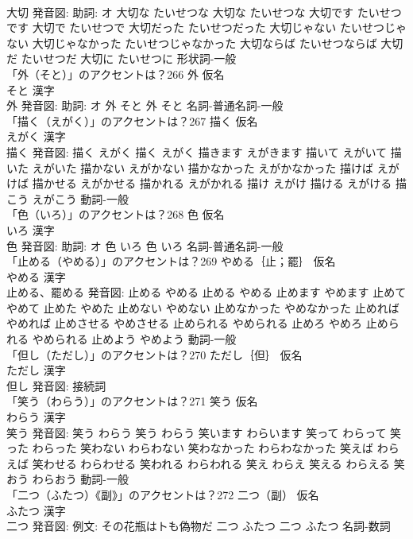 \documentclass[8pt]{extreport}
\begin{document}
\begin{CJK}{UTF8}{min}
\\	大切 発音図: 助詞: オ	大切な たいせつな		大切な たいせつな 大切です たいせつです 大切で たいせつで 大切だった たいせつだった 大切じゃない たいせつじゃない 大切じゃなかった たいせつじゃなかった 大切ならば たいせつならば 大切だ たいせつだ 大切に たいせつに				形状詞-一般 
\\	「外（そと）」のアクセントは？266	外 仮名　
\\	そと 漢字　
\\	外 発音図: 助詞: オ	外 そと		外 そと				名詞-普通名詞-一般 
\\	「描く（えがく）」のアクセントは？267	描く 仮名　
\\	えがく 漢字　
\\	描く 発音図:	描く えがく		描く えがく 描きます えがきます 描いて えがいて 描いた えがいた 描かない えがかない 描かなかった えがかなかった 描けば えがけば 描かせる えがかせる 描かれる えがかれる 描け えがけ 描ける えがける 描こう えがこう				動詞-一般 
\\	「色（いろ）」のアクセントは？268	色 仮名　
\\	いろ 漢字　
\\	色 発音図: 助詞: オ	色 いろ		色 いろ				名詞-普通名詞-一般 
\\	「止める（やめる）」のアクセントは？269	やめる｛止；罷｝ 仮名　
\\	やめる 漢字　
\\	止める、罷める 発音図:	止める やめる		止める やめる 止めます やめます 止めて やめて 止めた やめた 止めない やめない 止めなかった やめなかった 止めれば やめれば 止めさせる やめさせる 止められる やめられる 止めろ やめろ 止められる やめられる 止めよう やめよう				動詞-一般 
\\	「但し（ただし）」のアクセントは？270	ただし｛但｝ 仮名　
\\	ただし 漢字　
\\	但し 発音図:							接続詞 
\\	「笑う（わらう）」のアクセントは？271	笑う 仮名　
\\	わらう 漢字　
\\	笑う 発音図:	笑う わらう		笑う わらう 笑います わらいます 笑って わらって 笑った わらった 笑わない わらわない 笑わなかった わらわなかった 笑えば わらえば 笑わせる わらわせる 笑われる わらわれる 笑え わらえ 笑える わらえる 笑おう わらおう				動詞-一般 
\\	「二つ（ふたつ）《副》」のアクセントは？272	二つ（副） 仮名　
\\	ふたつ 漢字　
\\	二つ 発音図: 例文: その花瓶はトも偽物だ	二つ ふたつ		二つ ふたつ				名詞-数詞 

\end{CJK}
\end{document}
